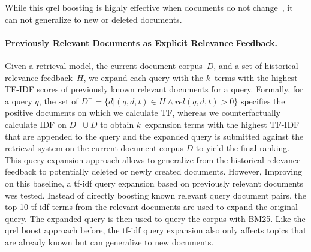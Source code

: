 While this qrel boosting is highly effective when documents do not change~\cite{alkhalifa:2024,keller:2024b}, it can not generalize to new or deleted documents.


\paragraph{Previously Relevant Documents as Explicit Relevance Feedback.} Given a retrieval model, the current document corpus~$D$, and a set of historical relevance feedback~$H$, we expand each query with the $k$~terms with the highest TF-IDF scores of previously known relevant documents for a query. Formally, for a query $q$, the set of $D^{+} = \{d| (q,d,t) \in H \wedge rel(q,d,t) > 0\}$ specifies the positive documents on which we calculate TF, whereas we counterfactually calculate IDF on $D^{+} \cup D$ to obtain $k$~expansion terms with the highest TF-IDF that are appended to the query and the expanded query is submitted against the retrieval system on the current document corpus $D$ to yield the final ranking. This query expansion approach allows to generalize from the historical relevance feedback to potentially deleted or newly created documents. However, 
Improving on this baseline, a tf-idf query expansion based on previously relevant documents wes tested. Instead of directly boosting known relevant query document pairs, the top 10 tf-idf terms from the relevant documents are used to expand the original query. The expanded query is then used to query the corpus with BM25. Like the qrel boost approach before, the tf-idf query expansion also only affects topics that are already known but can generalize to new documents.


